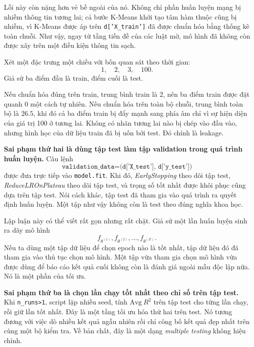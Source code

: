 Lỗi này còn nặng hơn vẻ bề ngoài của nó. Không chỉ phần huấn luyện mạng bị nhiễm thông tin tương lai; cả bước K-Means khởi tạo tâm hàm thuộc cũng bị nhiễm, vì K-Means được áp trên \texttt{d['X\_train']} đã được chuẩn hóa bằng thống kê toàn chuỗi. Như vậy, ngay từ tầng tiền đề của các luật mờ, mô hình đã không còn được xây trên một điều kiện thông tin sạch.

\begin{example}
Xét một đặc trưng một chiều với bốn quan sát theo thời gian:
\[
1,\quad 2,\quad 3,\quad 100.
\]
Giả sử ba điểm đầu là train, điểm cuối là test.

Nếu chuẩn hóa đúng trên train, trung bình train là \(2\), nên ba điểm train được đặt quanh 0 một cách tự nhiên. Nếu chuẩn hóa trên toàn bộ chuỗi, trung bình toàn bộ là \(26.5\), khi đó cả ba điểm train bị đẩy mạnh sang phía âm chỉ vì sự hiện diện của giá trị 100 ở tương lai. Không có nhãn tương lai nào bị chép vào đầu vào, nhưng hình học của dữ liệu train đã bị uốn bởi test. Đó chính là leakage.
\end{example}

\textbf{Sai phạm thứ hai là dùng tập test làm tập validation trong quá trình huấn luyện.} Câu lệnh
\[
\texttt{validation\_data=(d['X\_test'], d['y\_test'])}
\]
được đưa trực tiếp vào \texttt{model.fit}. Khi đó, \emph{EarlyStopping} theo dõi tập test, \emph{ReduceLROnPlateau} theo dõi tập test, và trọng số tốt nhất được khôi phục cũng dựa trên tập test. Nói cách khác, tập test đã tham gia vào quá trình ra quyết định huấn luyện. Một tập như vậy không còn là test theo đúng nghĩa khoa học.

Lập luận này có thể viết rất gọn nhưng rất chặt. Giả sử một lần huấn luyện sinh ra dãy mô hình
\[
f_{\theta^{(1)}}, f_{\theta^{(2)}}, \dots, f_{\theta^{(E)}}.
\]
Nếu ta dùng một tập dữ liệu để chọn epoch nào là tốt nhất, tập dữ liệu đó đã tham gia vào thủ tục chọn mô hình. Một tập vừa tham gia chọn mô hình vừa được dùng để báo cáo kết quả cuối không còn là đánh giá ngoài mẫu độc lập nữa. Nó là một phần của tối ưu.

\textbf{Sai phạm thứ ba là chọn lần chạy tốt nhất theo chỉ số trên tập test.} Khi \texttt{n\_runs>1}, script lặp nhiều seed, tính \(\mathrm{Avg}\ R^2\) trên tập test cho từng lần chạy, rồi giữ lần tốt nhất. Đây là một tầng tối ưu hóa thứ hai trên test. Nó tương đương với việc dò nhiều kết quả ngẫu nhiên rồi chỉ công bố kết quả đẹp nhất trên cùng một bộ kiểm tra. Về bản chất, đây là một dạng \emph{multiple testing} không hiệu chỉnh.

